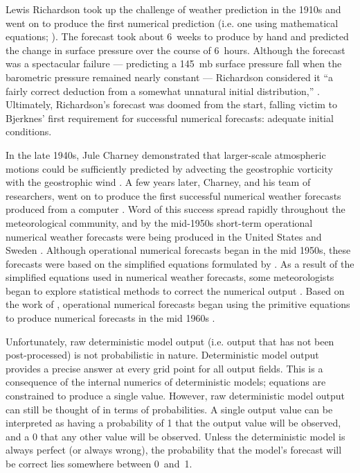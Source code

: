 Lewis Richardson took up the challenge of weather prediction in the 1910s and went on to produce the first numerical prediction (i.e. one using mathematical equations; \citealp{Lynch2008}).
The forecast took about \mbox{6 weeks} to produce by hand and predicted the change in surface pressure over the course of \mbox{6 hours}.
Although the forecast was a spectacular failure --- predicting a \mbox{145 mb} surface pressure fall when the barometric pressure remained nearly constant --- Richardson considered it ``a fairly correct deduction from a somewhat unnatural initial distribution,'' \citep{Lynch2008}.
Ultimately, Richardson's forecast was doomed from the start, falling victim to Bjerknes' first requirement for successful numerical forecasts: adequate initial conditions.


In the late 1940s, Jule Charney demonstrated that larger-scale atmospheric motions could be sufficiently predicted by advecting the geostrophic vorticity with the geostrophic wind \citep{Charney1947}.
A few years later, Charney, and his team of researchers, went on to produce the first successful numerical weather forecasts produced from a computer \citep{Charney1950}.
Word of this success spread rapidly throughout the meteorological community, and by the mid-1950s short-term operational numerical weather forecasts were being produced in the United States and Sweden \citep{Lewis2005}.
Although operational numerical forecasts began in the mid 1950s, these forecasts were based on the simplified equations formulated by \cite{Charney1947}.
As a result of the simplified equations used in numerical weather forecasts, some meteorologists began to explore statistical methods to correct the numerical output \citep{Gleeson1961}.
Based on the work of \cite{Hinkelmann1951}, operational numerical forecasts began using the primitive equations to produce numerical forecasts in the mid 1960s \citep{Lynch2008}.


Unfortunately, raw deterministic model output (i.e. output that has not been post-processed) is not probabilistic in nature.
Deterministic model output provides a precise answer at every grid point for all output fields.
This is a consequence of the internal numerics of deterministic models; equations are constrained to produce a single value.
However, raw deterministic model output can still be thought of in terms of probabilities.
A single output value can be interpreted as having a probability of 1 that the output value will be observed, and a 0 that any other value will be observed.
Unless the deterministic model is always perfect (or always wrong), the probability that the model's forecast will be correct lies somewhere between \mbox{0 and 1}.


